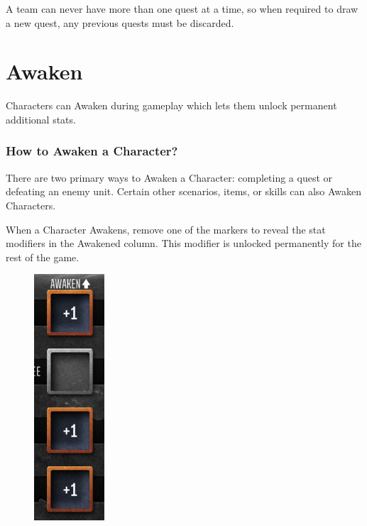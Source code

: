 \documentclass[../main.tex]{subfiles}
\begin{document}
A team can never have more than one quest at a time, so when required to draw a new quest, any previous quests must be discarded.

\section{Awaken}
Characters can Awaken during gameplay which lets them unlock permanent additional stats.

\subsubsection{How to Awaken a Character?}
There are two primary ways to Awaken a Character: completing a quest or defeating an enemy unit. Certain other scenarios, items, or skills can also Awaken Characters.

When a Character Awakens, remove one of the markers to reveal the stat modifiers in the Awakened column. This modifier is unlocked permanently for the rest of the game.

\begin{figure}[h]
    \centering
    \includegraphics[width=0.25\linewidth]{chapters//Skills/TimeStrikeAwakenGraphic.png}
\end{figure}

\clearpage
\end{document}
